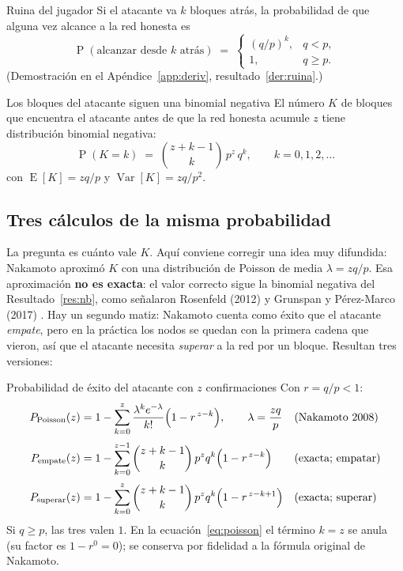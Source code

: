 \documentclass[11pt,a4paper]{article}
\newcommand{\Prob}[1]{\operatorname{P}\!\left(#1\right)}
\newcommand{\Esp}[1]{\operatorname{E}\!\left[#1\right]}
\newcommand{\Var}[1]{\operatorname{Var}\!\left[#1\right]}
\begin{document}
\begin{resultado}{Ruina del jugador}\label{res:ruina}
Si el atacante va $k$ bloques atrás, la probabilidad de que alguna vez alcance a la red honesta es
\[
  \Prob{\text{alcanzar desde }k\text{ atrás}}\;=\;
  \begin{cases}
    (q/p)^{k}, & q<p,\\[2pt]
    1, & q\ge p.
  \end{cases}
\]
(Demostración en el Apéndice~\ref{app:deriv}, resultado~\ref{der:ruina}.)
\end{resultado}

\begin{resultado}{Los bloques del atacante siguen una binomial negativa}\label{res:nb}
El número $K$ de bloques que encuentra el atacante antes de que la red honesta acumule $z$ tiene distribución binomial negativa:
\[
  \Prob{K=k}\;=\;\binom{z+k-1}{k}\,p^{z}\,q^{k},\qquad k=0,1,2,\dots
\]
con $\Esp{K}=zq/p$ y $\Var{K}=zq/p^{2}$.
\end{resultado}

\subsection{Tres cálculos de la misma probabilidad}

La pregunta es cuánto vale $K$. Aquí conviene corregir una idea muy difundida: Nakamoto aproximó $K$ con una distribución de Poisson de media $\lambda=zq/p$. Esa aproximación \textbf{no es exacta}: el valor correcto sigue la binomial negativa del Resultado~\ref{res:nb}, como señalaron Rosenfeld (2012) \cite{rosenfeld2012} y Grunspan y Pérez-Marco (2017) \cite{grunspan2017}. Hay un segundo matiz: Nakamoto cuenta como éxito que el atacante \emph{empate}, pero en la práctica los nodos se quedan con la primera cadena que vieron, así que el atacante necesita \emph{superar} a la red por un bloque. Resultan tres versiones:

\begin{resultado}{Probabilidad de éxito del atacante con $z$ confirmaciones}\label{res:formulas}
Con $r=q/p<1$:
\begin{align}
  P_{\text{Poisson}}(z)&=1-\sum_{k=0}^{z}\frac{\lambda^{k}e^{-\lambda}}{k!}\Bigl(1-r^{\,z-k}\Bigr),\qquad \lambda=\frac{zq}{p}
    &&\text{(Nakamoto 2008)}\label{eq:poisson}\\[2pt]
  P_{\text{empate}}(z)&=1-\sum_{k=0}^{z-1}\binom{z+k-1}{k}\,p^{z}q^{k}\Bigl(1-r^{\,z-k}\Bigr)
    &&\text{(exacta; empatar)}\label{eq:empate}\\[2pt]
  P_{\text{superar}}(z)&=1-\sum_{k=0}^{z}\binom{z+k-1}{k}\,p^{z}q^{k}\Bigl(1-r^{\,z-k+1}\Bigr)
    &&\text{(exacta; superar)}\label{eq:superar}
\end{align}
Si $q\ge p$, las tres valen $1$. En la ecuación~\eqref{eq:poisson} el término $k=z$ se anula (su factor es $1-r^{0}=0$); se conserva por fidelidad a la fórmula original de Nakamoto.
\end{resultado}
\end{document}
